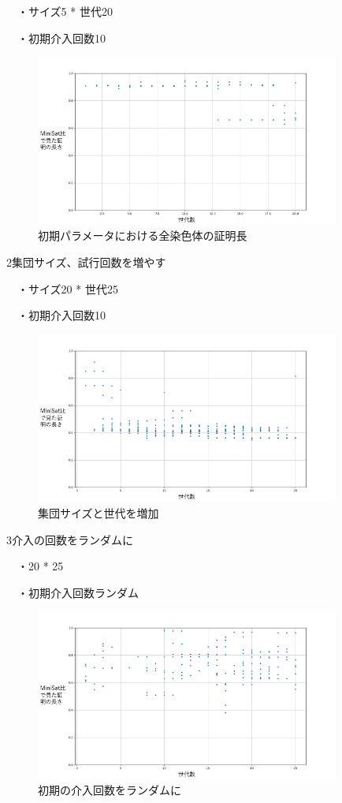 　・サイズ5 * 世代20

　・初期介入回数10

\begin{figure}[h]
    \centering
    \includegraphics[width=10cm]{figures/Experiment1/1.png}
    \caption{初期パラメータにおける全染色体の証明長}
\end{figure}

2集団サイズ、試行回数を増やす

　・サイズ20 * 世代25

　・初期介入回数10 %

\begin{figure}[h]
    \centering
    \includegraphics[width=10cm]{figures/Experiment1/2.png}
    \caption{集団サイズと世代を増加}
\end{figure}

3介入の回数をランダムに

　・20 * 25

　・初期介入回数ランダム

\begin{figure}[h]
    \centering
    \includegraphics[width=10cm]{figures/Experiment1/3.png}
    \caption{初期の介入回数をランダムに}
\end{figure}

